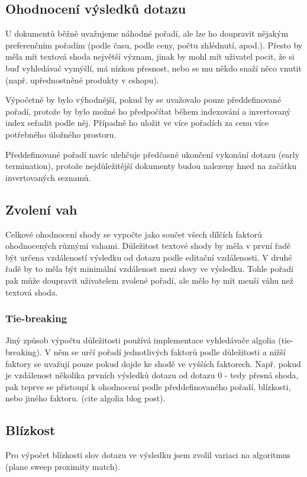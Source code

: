\documentclass[11pt,letterpaper,oneside,openright]{book}
\begin{document}
\subsection{Ohodnocení výsledků dotazu}
U dokumentů běžně uvažujeme náhodné pořadí, ale lze ho doupravit nějakým
preferenčním pořadím (podle času, podle ceny, počtu zhlédnutí, apod.). Přesto
by měla mít textová shoda největší význam, jinak by mohl mít uživatel pocit, že
si buď vyhledávač vymýšlí, má nízkou přesnost, nebo se mu někdo snaží něco
vnutit (např. upřednostněné produkty v eshopu).

Výpočetně by bylo výhodnější, pokud by se uvažovalo pouze předdefinované
pořadí, protože by bylo možné ho předpočítat během indexování a invertovaný
index seřadit podle něj. Případně ho uložit ve více pořadích za cenu více
potřebného úložného prostoru.

Předdefinované pořadí navíc ulehčuje předčasné ukončení vykonání dotazu (early
termination), protože nejdůležitější dokumenty budou nalezeny hned na začátku
invertovaných seznamů.

\subsection{Zvolení vah}
Celkové ohodnocení shody se vypočte jako součet všech dílčích faktorů
ohodnocených různými vahami. Důležitost textové shody by měla v první řadě být
určena vzdáleností výsledku od dotazu podle editační vzdálenosti. V druhé řadě
by to měla být minimální vzdálenost mezi slovy ve výsledku.  Tohle pořadí pak
může doupravit uživatelem zvolené pořadí, ale mělo by mít menší váhu než
textová shoda.

\subsubsection{Tie-breaking}
Jiný způsob výpočtu důležitosti používá implementace vyhledávače algolia
(tie-breaking). V něm se určí pořadí jednotlivých faktorů podle
důležitosti a nižší faktory se uvažují pouze pokud dojde ke shodě ve
vyšších faktorech. Např.  pokud je vzdálenost několika prvních výsledků
dotazu od dotazu 0 - tedy přesná shoda, pak teprve se přistoupí k
ohodnocení podle předdefinovaného pořadí, blízkosti, nebo jiného
faktoru. (cite algolia blog post).

\subsection{Blízkost}
Pro výpočet blízkosti slov dotazu ve výsledku jsem zvolil variaci na algoritmus
(plane sweep proximity match).
\end{document}
